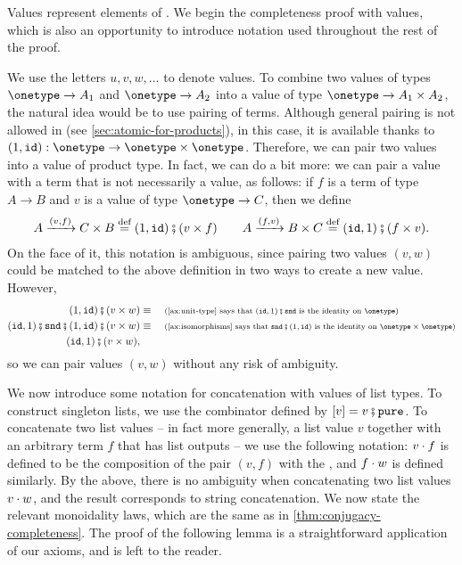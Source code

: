 Values represent elements of . We begin the completeness proof with values, which is also an opportunity to introduce notation used throughout the rest of the proof.

We use the letters $u, v, w, \ldots$ to denote values. To combine two values of types $\onetype \to A_1$ and $\onetype \to A_2$ into a value of type $\onetype \to A_1 \times A_2$, the natural idea would be to use pairing of terms. Although general pairing is not allowed in  (see \cref{sec:atomic-for-products}), in this case, it is available thanks to $\unitlterm : \onetype \to \onetype \times \onetype$. Therefore, we can pair two values into a value of product type. In fact, we can do a bit more: we can pair a value with a term that is not necessarily a value, as follows: if $f$ is a term of type $A \to B$  and  $v$ is a value of type $\onetype  \to C$, then we define
\begin{align*}
A \xrightarrow{(v,f)} C \times B \eqdef \prependoneterm\comp (v \times f)  
\qquad 
A \xrightarrow {(f,v)} B \times C \eqdef \appendoneterm\comp (f \times v).
\end{align*}
On the face of it, this notation is ambiguous, since pairing two values $(v,w)$ could be matched to the above definition in two ways to create a new value. However,
\begin{align*}
\prependoneterm\comp(v \times w) \equalbecause{\cref{ax:unit-type} says that $\appendoneterm\comp\sndterm$ is the identity on $\onetype$}\\
\appendoneterm\comp \sndterm\comp \prependoneterm\comp(v \times w) \equalbecause{\cref{ax:isomorphisms} says that $\sndterm\comp \prependoneterm$ is the identity on $\onetype \times \onetype$}\\
\appendoneterm\comp(v \times w),
\end{align*}
so we can pair values $(v,w)$ without any risk of ambiguity.

We now introduce some notation for concatenation with values of list types. To construct singleton lists, we use the combinator  defined by $[v] = v\comp\pureterm$. To concatenate two list values -- in fact more generally, a list value $v$ together with an arbitrary term $f$ that has  list outputs -- we use the following notation: $v \cdot f$ is defined to be the composition of the pair $(v,f)$ with the , and $f \cdot w$ is defined similarly.
By  the above,   there is no ambiguity when concatenating two list values $v \cdot w$, and the result corresponds to string concatenation.
We now state the relevant monoidality laws, which are the same as in \cref{thm:conjugacy-completeness}. The proof of the following lemma is a straightforward application of our axioms, and is left to the reader.

